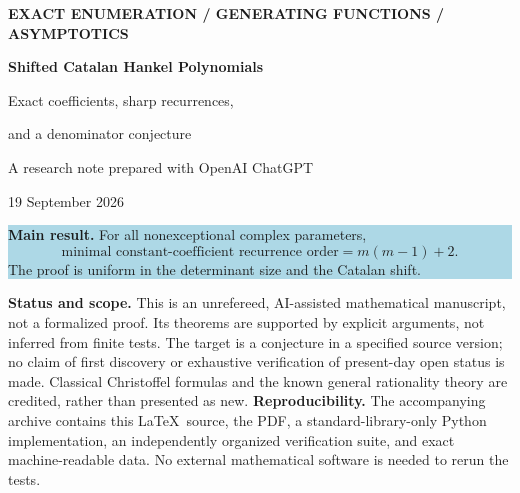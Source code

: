 \documentclass[11pt,a4paper]{article}
\numberwithin{equation}{section}
\theoremstyle{definition}
\theoremstyle{remark}
\begin{document}
\thispagestyle{empty}
\begin{center}
{\small\sffamily\bfseries\color{muted}EXACT ENUMERATION \quad / \quad GENERATING FUNCTIONS \quad / \quad ASYMPTOTICS}\par
\vspace{10mm}
{\LARGE\bfseries\color{inkblue}Shifted Catalan Hankel Polynomials}\par
\vspace{3mm}
{\Large Exact coefficients, sharp recurrences,\par and a denominator conjecture}\par
\vspace{7mm}
{A research note prepared with OpenAI ChatGPT}\par
{19 September 2026}
\end{center}
\vspace{5mm}
\begin{abstract}
For the Catalan numbers $C_n$, consider the size-$N$ determinant
$D_N^{(m)}(a,b)=\det(aC_{i+j+m}+bC_{i+j+m+1})_{0\leq i,j<N}$.
We give a self-contained proof of the denominator-exponent conjecture stated
in Paul Barry's 2020 note on this family.  With $d=\binom m2$, the generating
function is $P_m(t)/(1-(a+2b)t+b^2t^2)^{d+1}$.  The denominator is minimal
whenever $b\ne0$, $a\ne0$, and $a\ne-4b$.  We determine every exceptional
case, prove that $\deg P_m=(m-1)^2$ for $b\ne0$, and establish a reciprocal
symmetry of the numerator.  An explicit positive-integer coefficient formula
also identifies and repairs a one-unit shift in the source's separate
Conjecture~2.  The essential degree reduction is a Vandermonde cancellation
in confluent Christoffel minors.  It yields an exact sum of two exponentials
with polynomial coefficients, a finite full asymptotic expansion, and an
explicit first correction.  Independent integer and rational computations,
including direct determinants and polynomial-identity certificates at fixed
sizes, accompany the proofs.
\end{abstract}
\vspace{3mm}
\noindent\colorbox{lightblue}{\parbox{\dimexpr\textwidth-2\fboxsep\relax}{%
\textbf{Main result.} For all nonexceptional complex parameters,
\[
\boxed{\ \text{minimal constant-coefficient recurrence order}
       =m(m-1)+2.\ }
\]
The proof is uniform in the determinant size and the Catalan shift.
}}\par
\vspace{5mm}
\noindent\textbf{Status and scope.}
This is an unrefereed, AI-assisted mathematical manuscript, not a formalized
proof.  Its theorems are supported by explicit arguments, not inferred from
finite tests.  The target is a conjecture in a specified source version;
no claim of first discovery or exhaustive verification of present-day
open status is made.  Classical Christoffel formulas and the known general
rationality theory are credited, rather than presented as new.
\vfill
\noindent\textbf{Reproducibility.} The accompanying archive contains this
\LaTeX\ source, the PDF, a standard-library-only Python implementation,
an independently organized verification suite, and exact machine-readable
data.  No external mathematical software is needed to rerun the tests.
\end{document}
